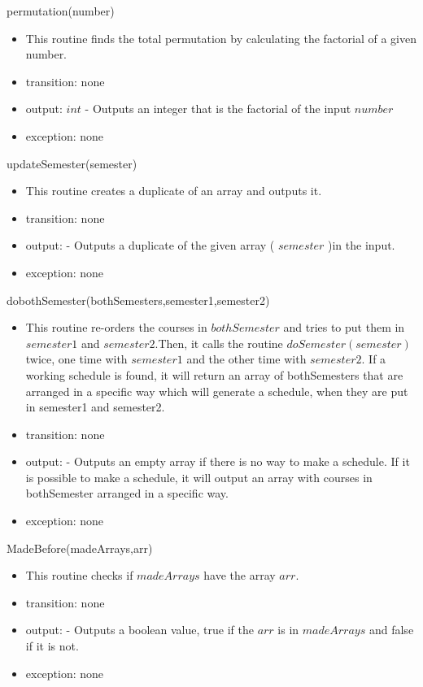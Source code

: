 \documentclass[11pt, oneside]{article}
\begin{document}
\noindent
permutation(number)
\begin{itemize}
\item This routine finds the total permutation by calculating the factorial of a given number.
\item transition: none
\item output: $ int $ - Outputs an integer that is the factorial of the input $number$
 \item exception: none
\end{itemize}

\noindent
updateSemester(semester)
\begin{itemize}
\item This routine creates a duplicate of an array and outputs it.
\item transition: none
\item output: - Outputs a duplicate of the given array ( $semester$ )in the input.
 \item exception: none
\end{itemize}

\noindent
dobothSemester(bothSemesters,semester1,semester2)
\begin{itemize}
\item This routine re-orders the courses in $bothSemester$ and tries to put them in $semester1$ and $semester 2$.Then, it calls the routine $doSemester(semester)$ twice, one time with $semester1$ and the other time with $semester2$. 
If a working schedule is found, it will return an array of bothSemesters that are arranged in a specific way which will generate a schedule, when they are put in semester1 and semester2.
\item transition: none
\item output: - Outputs an empty array if there is no way to make a schedule. If it is possible to make a schedule, it will output an array with courses in bothSemester arranged in a specific way.
 \item exception: none
\end{itemize}

\noindent
MadeBefore(madeArrays,arr)
\begin{itemize}
\item This routine checks if $madeArrays$ have the array $arr$.
\item transition: none
\item output: - Outputs a boolean value, true if the $arr$ is in $madeArrays$ and false if it is not.
 \item exception: none
\end{itemize}
\end{document}
